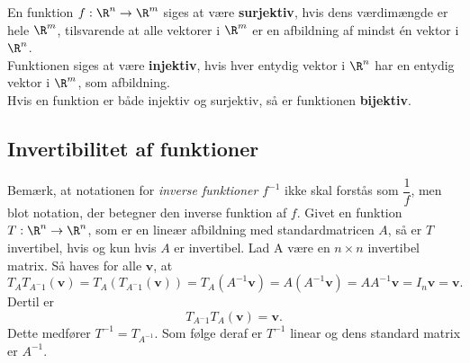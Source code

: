\begin{defn}{}{}
En funktion $f:\R^n \rightarrow \R^m$ siges at være \textbf{surjektiv}, hvis dens værdimængde er hele $\R^m$, tilsvarende at alle vektorer i $\R^m$ er en afbildning af mindst én vektor i $\R^n$.\\
Funktionen siges at være \textbf{injektiv}, hvis hver entydig vektor i $\R^n$ har en entydig vektor i $\R^m$, som afbildning.\\
Hvis en funktion er både injektiv og surjektiv, så er funktionen \textbf{bijektiv}.
\end{defn}
%
%
\subsection{Invertibilitet af funktioner}
%
Bemærk, at notationen for \textit{inverse funktioner} $f^{-1}$ ikke skal forstås som $\dfrac{1}{f}$, men blot notation, der betegner den inverse funktion af $f$.
Givet en funktion $T:\R^n \rightarrow \R^n$, som er en lineær afbildning med standardmatricen $A$, så er $T$ invertibel, hvis og kun hvis $A$ er invertibel. 
Lad A være en $n \times n$ invertibel matrix. 
Så haves for alle $\textbf{v}$, at
$$T_AT_{A^-1}(\textbf{v})=T_A(T_{A^-1}(\textbf{v}))=T_A(A^{-1}\textbf{v})=A(A^{-1}\textbf{v})=AA^{-1}\textbf{v}=I_n\textbf{v}=\textbf{v}.$$ Dertil er
$$T_{A^-1}T_A(\textbf{v})=\textbf{v}.$$
%
Dette medfører $T^{-1}=T_{A^{-1}}$. 
Som følge deraf er $T^{-1}$ linear og dens standard matrix er $A^{-1}$.
\\
%
